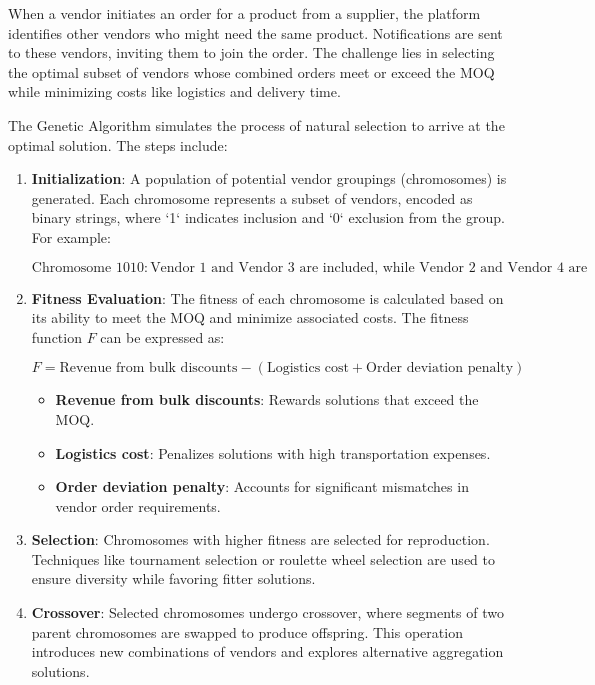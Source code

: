 When a vendor initiates an order for a product from a supplier, the platform identifies other vendors who might need the same product. Notifications are sent to these vendors, inviting them to join the order. The challenge lies in selecting the optimal subset of vendors whose combined orders meet or exceed the MOQ while minimizing costs like logistics and delivery time.

The Genetic Algorithm simulates the process of natural selection to arrive at the optimal solution. The steps include:

\begin{enumerate}
    \item \textbf{Initialization}: A population of potential vendor groupings (chromosomes) is generated. Each chromosome represents a subset of vendors, encoded as binary strings, where `1` indicates inclusion and `0` exclusion from the group. For example:
    
    \[
    \text{Chromosome } 1010: \text{Vendor 1 and Vendor 3 are included, while Vendor 2 and Vendor 4 are excluded.}
    \]
    
    \item \textbf{Fitness Evaluation}: The fitness of each chromosome is calculated based on its ability to meet the MOQ and minimize associated costs. The fitness function \(F\) can be expressed as:
    
    \[
    F = \text{Revenue from bulk discounts} - \left( \text{Logistics cost} + \text{Order deviation penalty} \right)
    \]

    \begin{itemize}
        \item \textbf{Revenue from bulk discounts}: Rewards solutions that exceed the MOQ.
        \item \textbf{Logistics cost}: Penalizes solutions with high transportation expenses.
        \item \textbf{Order deviation penalty}: Accounts for significant mismatches in vendor order requirements.
    \end{itemize}
    
    \item \textbf{Selection}: Chromosomes with higher fitness are selected for reproduction. Techniques like tournament selection or roulette wheel selection are used to ensure diversity while favoring fitter solutions.
    
    \item \textbf{Crossover}: Selected chromosomes undergo crossover, where segments of two parent chromosomes are swapped to produce offspring. This operation introduces new combinations of vendors and explores alternative aggregation solutions.
    

\end{enumerate}
